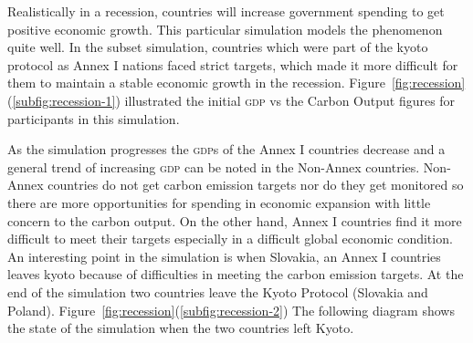 Realistically in a recession, countries will increase government spending to get positive economic growth. This particular simulation models the phenomenon quite well. In the subset simulation, countries which were part of the kyoto protocol as Annex I nations faced strict targets, which made it more difficult for them to maintain a stable economic growth in the recession. Figure~\ref{fig:recession}(\ref{subfig:recession-1}) illustrated the initial \textsc{gdp} vs the Carbon Output figures for participants in this simulation.

As the simulation progresses the \textsc{gdp}s of the Annex I countries decrease and a general trend of increasing \textsc{gdp} can be noted in the Non-Annex countries. Non-Annex countries do not get carbon emission targets nor do they get monitored so there are more opportunities for spending in economic expansion with little concern to the carbon output. On the other hand, Annex I countries find it more difficult to meet their targets especially in a difficult global economic condition. An interesting point in the simulation is when Slovakia, an Annex I countries leaves kyoto because of difficulties in meeting the carbon emission targets. At the end of the simulation two countries leave the Kyoto Protocol (Slovakia and Poland). Figure~\ref{fig:recession}(\ref{subfig:recession-2}) The following diagram shows the state of the simulation when the two countries left Kyoto.


